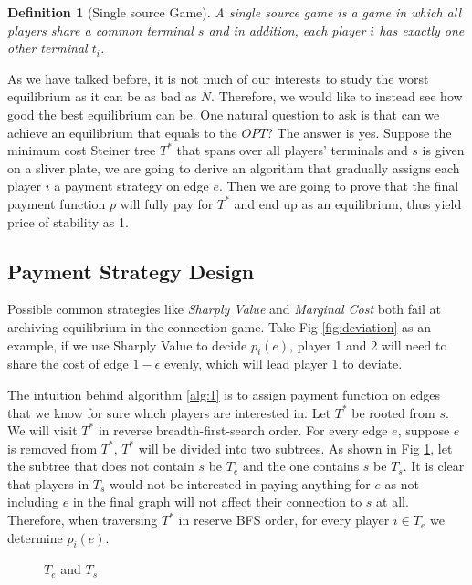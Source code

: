 \documentclass[11pt,psfig,times]{article}
\newtheorem{definition}{Definition}[section]
\begin{document}
\begin{definition}[Single source Game]
	A single source game is a game in which all players share a common terminal \(s\) and in addition, each player \(i\) has exactly one other terminal \(t_i\).
\end{definition}

As we have talked before, it is not much of our interests to study the worst equilibrium as it can be as bad as $N$. Therefore, we would like to instead see how good the best equilibrium can be. One natural question to ask is that can we achieve an equilibrium that equals to the \(OPT\)? The answer is yes. Suppose the minimum cost Steiner tree \(T^*\) that spans over all players' terminals and $s$ is given on a sliver plate, we are going to derive an algorithm that gradually assigns each player \(i\) a payment strategy on edge \(e\). Then we are going to prove that the final payment function \(p\) will fully pay for $T^*$ and end up as an equilibrium, thus yield price of stability as 1.  

\subsection{Payment Strategy Design}
Possible common strategies like \textit{Sharply Value} and \textit{Marginal Cost} both fail at archiving equilibrium in the connection game. Take Fig \ref{fig:deviation} as an example, if we use Sharply Value to decide $p_i(e)$, player 1 and 2 will need to share the cost of edge $1-\epsilon$ evenly, which will lead player 1 to deviate. 

The intuition behind algorithm \ref{alg:1} is to assign payment function on edges that we know for sure which players are interested in. Let \(T^*\) be rooted from \(s\). We will visit \(T^*\) in reverse breadth-first-search order. For every edge \(e\), suppose \(e\) is removed from \(T^*\), \(T^*\) will be divided into two subtrees. As shown in Fig \ref{fig:tets}, let the subtree that does not contain \(s\) be \(T_e\) and the one contains \(s\) be \(T_s\). It is clear that players in \(T_s\) would not be interested in paying anything for \(e\) as not including \(e\) in the final graph will not affect their connection to \(s\) at all. Therefore, when traversing \(T^*\) in reserve BFS order, for every player \(i \in T_e\) we determine \(p_i(e)\).

\begin{figure}[H]
	\begin{center}
	\end{center}
	\caption{$T_e$ and $T_s$}
	\label{fig:tets}
\end{figure}
\end{document}
